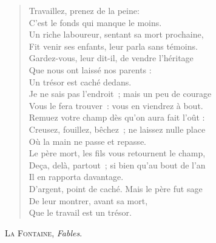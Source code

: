 \documentclass[14pt,a4paper,french]{scrartcl}
\begin{document}
\settowidth{\versewidth}{Un riche laboureur, sentant sa mort prochaine,}

\begin{verse}
\vin Travaillez, prenez de la peine:\\
\vin C'est le fonds\footnotemark{} qui manque le moins.\\
Un riche laboureur, sentant sa mort prochaine,\\
Fit venir ses enfants, leur parla sans témoins.\\
Gardez-vous, leur dit-il, de vendre l'héritage\\
\vin Que nous ont laissé nos parents :\\
\vin Un trésor est caché dedans.\\
Je ne sais pas l'endroit ; mais un peu de courage\\
Vous le fera trouver : vous en viendrez à bout.\\
Remuez votre champ dès qu'on aura fait l'oût :\\
Creusez, fouillez, bêchez ; ne laissez nulle place\\
\vin Où la main ne passe et repasse.\\
Le père mort, les fils vous retournent le champ,\\
Deça, delà, partout ; si bien qu'au bout de l'an\\
\vin Il en rapporta davantage.\\
D'argent, point de caché. Mais le père fut sage\\
\vin De leur montrer, avant sa mort,\\
\vin Que le travail est un trésor.
\end{verse}

\begin{flushright}
\large
\textsc{La Fontaine}, \textit{Fables}.
\end{flushright}

\end{document}
